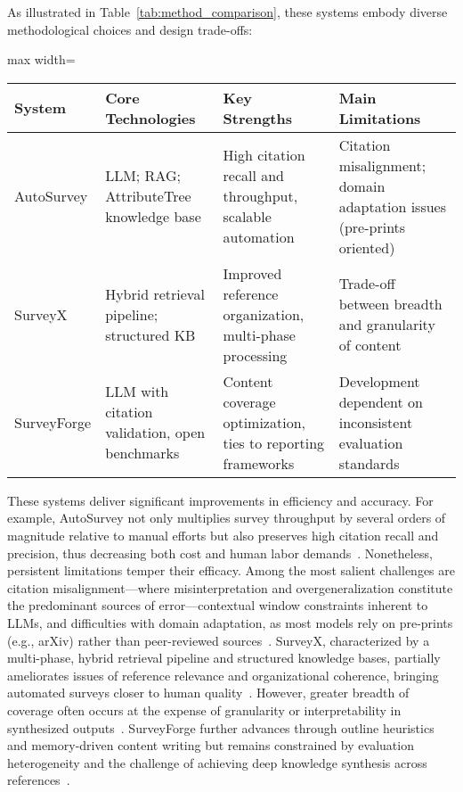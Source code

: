 \documentclass[sigconf]{acmart}
\begin{document}
As illustrated in Table~\ref{tab:method_comparison}, these systems embody diverse methodological choices and design trade-offs:

\begin{table*}[htbp]
\centering
\caption{Comparison of Leading AI-Driven Survey Automation Systems}
\label{tab:method_comparison}
\begin{adjustbox}{max width=\textwidth}
\begin{tabular}{@{}llll@{}}
\toprule
System & Core Technologies & Key Strengths & Main Limitations \\
\midrule
AutoSurvey & LLM; RAG; AttributeTree knowledge base & High citation recall and throughput, scalable automation~\cite{ref10} & Citation misalignment; domain adaptation issues (pre-prints oriented)~\cite{ref10} \\
SurveyX    & Hybrid retrieval pipeline; structured KB & Improved reference organization, multi-phase processing~\cite{ref11} & Trade-off between breadth and granularity of content~\cite{ref11} \\
SurveyForge & LLM with citation validation, open benchmarks & Content coverage optimization, ties to reporting frameworks~\cite{ref12} & Development dependent on inconsistent evaluation standards~\cite{ref12} \\
\bottomrule
\end{tabular}
\end{adjustbox}
\end{table*}

These systems deliver significant improvements in efficiency and accuracy. For example, AutoSurvey not only multiplies survey throughput by several orders of magnitude relative to manual efforts but also preserves high citation recall and precision, thus decreasing both cost and human labor demands~\cite{ref10}. Nonetheless, persistent limitations temper their efficacy. Among the most salient challenges are citation misalignment—where misinterpretation and overgeneralization constitute the predominant sources of error—contextual window constraints inherent to LLMs, and difficulties with domain adaptation, as most models rely on pre-prints (e.g., arXiv) rather than peer-reviewed sources~\cite{ref10,ref11,ref12}. SurveyX, characterized by a multi-phase, hybrid retrieval pipeline and structured knowledge bases, partially ameliorates issues of reference relevance and organizational coherence, bringing automated surveys closer to human quality~\cite{ref11}. However, greater breadth of coverage often occurs at the expense of granularity or interpretability in synthesized outputs~\cite{ref11}. SurveyForge further advances through outline heuristics and memory-driven content writing but remains constrained by evaluation heterogeneity and the challenge of achieving deep knowledge synthesis across references~\cite{ref12}.
\end{document}
